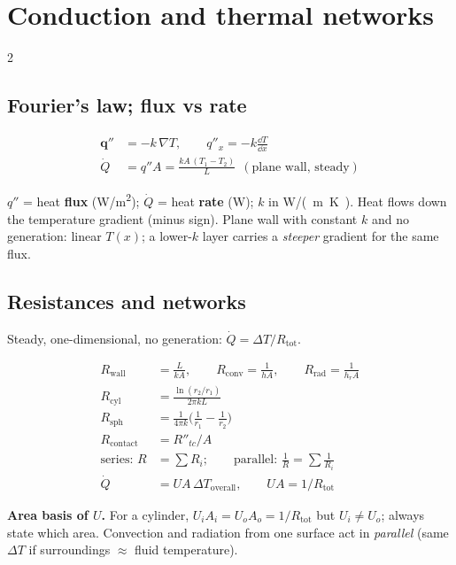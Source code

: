 \section{Conduction and thermal networks}\label{sec:conduction}
\begin{multicols}{2}
\subsection{Fourier's law; flux vs rate}\label{sec:fourier}
\CORE{}
\begin{formulabox}
\vspace{-6pt}
\begin{align}
\mathbf{q}'' &= -k\,\nabla T,\qquad q''_x=-k\frac{\dd T}{\dd x} \label{F:transfer:fourier}\\
\dot Q &= q''A = \frac{kA\,(T_1-T_2)}{L}\ \ (\text{plane wall, steady}) \label{F:transfer:wall}
\end{align}
\end{formulabox}
$q''$ = heat \textbf{flux} (\si{W/m^2}); $\dot Q$ = heat \textbf{rate} (\si{W}); $k$ in \si{W/(m.K)}. Heat flows down the temperature gradient (minus sign). Plane wall with constant $k$ and no generation: linear $T(x)$; a lower-$k$ layer carries a \emph{steeper} gradient for the same flux.

\subsection{Resistances and networks}\label{sec:resistances}
\CORE{} Steady, one-dimensional, no generation: $\dot Q=\Delta T/R_{\text{tot}}$.
\begin{formulabox}
\vspace{-6pt}
\begin{align}
R_{\text{wall}} &= \frac{L}{kA},\qquad R_{\text{conv}}=\frac{1}{hA},\qquad R_{\text{rad}}=\frac{1}{h_rA} \label{F:transfer:Rwall}\\
R_{\text{cyl}} &= \frac{\ln(r_2/r_1)}{2\pi kL} \label{F:transfer:Rcyl}\\
R_{\text{sph}} &= \frac{1}{4\pi k}\Big(\frac{1}{r_1}-\frac{1}{r_2}\Big) \label{F:transfer:Rsph}\\
R_{\text{contact}} &= R''_{tc}/A \label{F:transfer:Rcontact}\\
\text{series: } R &= \textstyle\sum R_i;\qquad \text{parallel: } \frac1R=\sum\frac{1}{R_i} \label{F:transfer:network}\\
\dot Q &= UA\,\Delta T_{\text{overall}},\qquad UA=1/R_{\text{tot}} \label{F:transfer:U}
\end{align}
\end{formulabox}
\textbf{Area basis of $U$.} For a cylinder, $U_iA_i=U_oA_o=1/R_{\text{tot}}$ but $U_i\ne U_o$; always state which area. Convection and radiation from one surface act in \emph{parallel} (same $\Delta T$ if surroundings $\approx$ fluid temperature).


\end{multicols}
